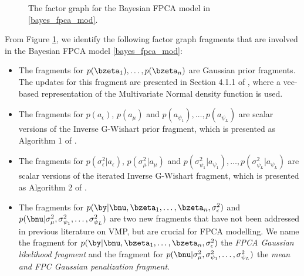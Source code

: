 \documentclass[12pt]{article}
\def\sigsqeps{\sigma^2_{\epsilon}}
\def\aeps{a_{\epsilon}}
\def\sigsqmu{\sigma^2_{\mu}}
\def\amu{a_{\mu}}
\newcommand\sigsqpsi[1]{\sigma^2_{\psi_{#1}}}
\newcommand\apsi[1]{a_{\psi_{#1}}}
\theoremstyle{plain}
\theoremstyle{definition}
\theoremstyle{remark}
\begin{document}
\begin{figure}
\caption{The factor graph for the Bayesian FPCA model in \eqref{bayes_fpca_mod}.}
\label{fig:fg_fpca}
\end{figure}

From Figure \ref{fig:fg_fpca}, we identify the following factor graph fragments that are involved in the Bayesian
FPCA model \eqref{bayes_fpca_mod}:

\begin{itemize}
	\item The fragments for $p (\bzeta_1), \dots, p(\bzeta_n)$ are Gaussian prior fragments. The updates for
	this fragment are presented in Section 4.1.1 of , where a vec-based representation of the
	Multivariate Normal density function is used.
	\item The fragments for $p (\aeps)$, $p (\amu)$ and $p (\apsi{1}), \dots, p (\apsi{L})$ are scalar versions
	of the Inverse G-Wishart prior fragment, which is presented as Algorithm 1 of .
	\item The fragments for $p (\sigsqeps | \aeps)$, $p (\sigsqmu | \amu)$ and $p (\sigsqpsi{1} | \apsi{1}), \dots,
	p (\sigsqpsi{L} | \apsi{L})$ are scalar versions of the iterated Inverse G-Wishart fragment, which is presented
	as Algorithm 2 of .
	\item The fragments for $p (\by | \bnu, \bzeta_1, \dots, \bzeta_n, \sigsqeps)$ and $p (\bnu | \sigsqmu,
	\sigsqpsi{1}, \dots, \sigsqpsi{L})$ are two new fragments that have not been addressed in previous literature
	on VMP, but are crucial for FPCA modelling.
	We name the fragment for $p (\by | \bnu, \bzeta_1, \dots, \bzeta_n, \sigsqeps)$ the \emph{FPCA
	Gaussian likelihood fragment} and the fragment for $p (\bnu | \sigsqmu, \sigsqpsi{1}, \dots, \sigsqpsi{L})$
	the \emph{mean and FPC Gaussian penalization fragment}.
\end{itemize}
\end{document}
